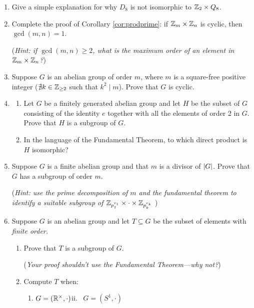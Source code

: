 \begin{exercises}
\begin{enumerate}
		
		\item Give a simple explanation for why $D_8$ is not isomorphic to $\mathbb{Z}_2\times Q_8$.
		
		
		\item\label{exs:corprodprime} Complete the proof of Corollary \ref{cor:prodprime}: if $\mathbb{Z}_m\times\mathbb{Z}_n$ is cyclic, then $\gcd(m,n)=1$.\par
		(\emph{Hint: if $\gcd(m,n)\ge 2$, what is the maximum order of an element in $\mathbb{Z}_m\times\mathbb{Z}_n$?})
	
	
		\item Suppose $G$ is an abelian group of order $m$, where $m$ is a square-free positive integer ($\nexists k\in \mathbb{Z}_{\ge 2}$ such that $k^2\!\mid\! m$). Prove that $G$ is cyclic.
	
	
		\item\begin{enumerate}
	  	\item Let $G$ be a finitely generated abelian group and let $H$ be the subset of $G$ consisting of the identity $e$ together with all the elements of order 2 in $G$. Prove that $H$ is a subgroup of $G$.
	  	\item In the language of the Fundamental Theorem, to which direct product is $H$ isomorphic?
		\end{enumerate}
		
		
		\item\label{exs:abeliansubgroup} Suppose $G$ is a finite abelian group and that $m$ is a divisor of $\left| G\right|$. Prove that $G$ has a subgroup of order $m$.\par
		(\emph{Hint: use the prime decomposition of $m$ and the fundamental theorem to identify a suitable subgroup of $\mathbb{Z}_{p_1^{r_1}}\times\cdot\times\mathbb{Z}_{p_k^{r_k}}$ })
		
	 	
		\item Suppose $G$ is an abelian group and let $T\subseteq G$ be the subset of elements with \emph{finite order.}
		\begin{enumerate}
		  \item Prove that $T$ is a subgroup of $G$.\par
		  (\emph{Your proof shouldn't use the Fundamental Theorem---why not?})
		  
		  \item Compute $T$ when:
		  \begin{enumerate}
		    \item $G=(\mathbb{R}^\times,\cdot)$\qquad\qquad ii. \ $G=(S^1,\cdot)$
			\end{enumerate}
		\end{enumerate}
	
	\end{enumerate}
\end{exercises}

\clearpage